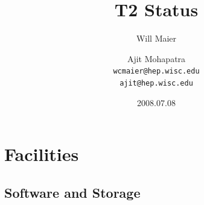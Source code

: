 \documentclass{beamer}
\title{T2 Status}
\author[Maier, Mohapatra]{
    Will Maier \and Ajit Mohapatra\\ 
    {\tt wcmaier@hep.wisc.edu}\\
    {\tt ajit@hep.wisc.edu}}
\institute[Wisconsin]{University of Wisconsin - High Energy Physics}
\date{2008.07.08}
\begin{document}
\begin{frame}
    \titlepage
\end{frame}



\section{Facilities}
\subsection{Software and Storage}
\end{document}

